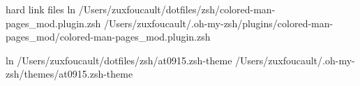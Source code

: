 
hard link files
ln /Users/zuxfoucault/dotfiles/zsh/colored-man-pages_mod.plugin.zsh /Users/zuxfoucault/.oh-my-zsh/plugins/colored-man-pages_mod/colored-man-pages_mod.plugin.zsh

ln /Users/zuxfoucault/dotfiles/zsh/at0915.zsh-theme /Users/zuxfoucault/.oh-my-zsh/themes/at0915.zsh-theme
